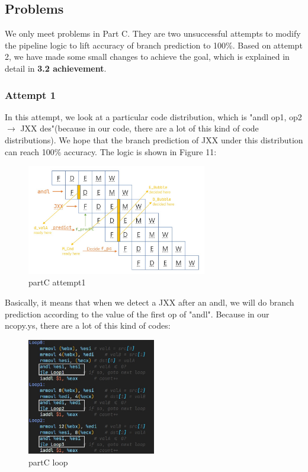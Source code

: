 \documentclass{article}
\begin{document}
\subsection{Problems}
We only meet problems in Part C. They are two unsuccessful attempts to modify the pipeline logic to lift accuracy of branch prediction to 100\%.
Based on attempt 2, we have made some small changes to achieve the goal, which is explained in detail in \textbf{3.2 achievement}.
\subsubsection{Attempt 1}
In this attempt, we look at a particular code distribution, 
which is "andl op1, op2 $\rightarrow$ JXX des"(because in our code, there are a lot of this kind of code distributions). 
We hope that the branch prediction of JXX under this distribution can reach 100\% accuracy.
The logic is shown in Figure 11:
\begin{figure}[H] %
        \centering %
        \includegraphics[width=0.7\textwidth]{partC-attempt1.jpg} %
        \caption{partC attempt1} %
        \label{Fig.partC-correctness} %
\end{figure}
Basically, it means that when we detect a JXX after an andl, 
we will do branch prediction according to the value of the first op of "andl". 
Because in our ncopy.ys, there are a lot of this kind of codes:
\begin{figure}[H] %
        \centering %
        \includegraphics[width=0.5\textwidth]{partC-loop-demo.jpg} %
        \caption{partC loop} %
        \label{Fig.partC-correctness} %
\end{figure}
\end{document}
